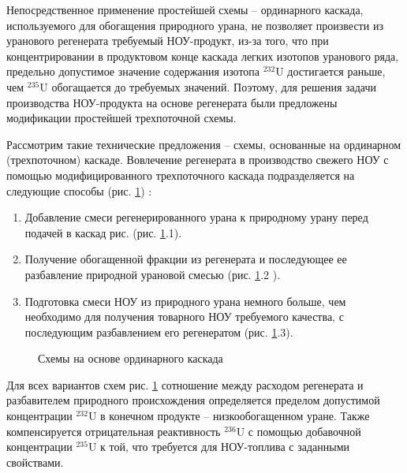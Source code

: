 Непосредственное применение простейшей схемы -- ординарного каскада, используемого для обогащения природного урана, не позволяет произвести из уранового регенерата требуемый НОУ-продукт, из-за того, что при концентрировании в продуктовом конце каскада легких изотопов уранового ряда, предельно допустимое значение содержания изотопа $^{232}$U достигается раньше, чем $^{235}$U обогащается до требуемых значений. Поэтому, для решения задачи производства НОУ-продукта на основе регенерата были предложены модификации простейшей трехпоточной схемы.

Рассмотрим такие технические предложения -- схемы, основанные на ординарном (трехпоточном) каскаде.
Вовлечение регенерата в производство свежего НОУ с помощью модифицированного трехпоточного каскада подразделяется на следующие способы (рис. \ref{fig:diagram1}) \cite{sulaberidzeNekotoryhRazdelitelnyhProblemah2004,smirnovKaskadnyeShemyZadachah2012}:
\begin{enumerate}
  \item Добавление смеси регенерированного урана к природному урану перед подачей в каскад рис. (рис. \ref{fig:diagram1}.1).
  \item Получение обогащенной фракции из регенерата и последующее ее разбавление природной урановой смесью (рис. \ref{fig:diagram1}.2 ).
  \item Подготовка смеси НОУ из природного урана немного больше, чем необходимо для получения товарного НОУ требуемого качества, с последующим разбавлением его регенератом (рис. \ref{fig:diagram1}.3).
\end{enumerate}

\begin{figure}[ht]
  \caption{Схемы на основе ординарного каскада}\label{fig:diagram1}
\end{figure}

Для всех вариантов схем рис. \ref{fig:diagram1} сотношение между расходом регенерата и разбавителем природного происхождения определяется пределом допустимой концентрации $^{232}$U в конечном продукте -- низкообогащенном уране. Также компенсируется отрицательная реактивность $^{236}$U с помощью добавочной концентрации $^{235}$U к той, что требуется для НОУ-топлива с заданными свойствами.

